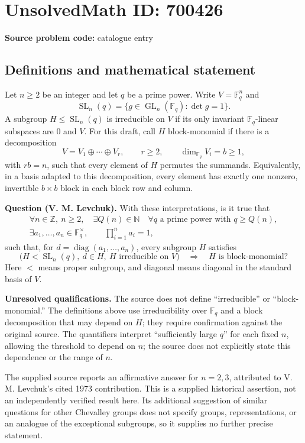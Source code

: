 \documentclass[11pt]{article}
\newcommand{\N}{\mathbb{N}}
\newcommand{\Z}{\mathbb{Z}}
\newcommand{\F}{\mathbb{F}}
\begin{document}
\section*{UnsolvedMath ID: 700426}
\textbf{Source problem code:} catalogue entry
\subsection{Definitions and mathematical statement}
Let \(n\geq 2\) be an integer and let \(q\) be a prime power. Write \(V=\F_q^n\) and
\[
\operatorname{SL}_n(q)=\{g\in\operatorname{GL}_n(\F_q):\det g=1\}.
\]
A subgroup \(H\leq\operatorname{SL}_n(q)\) is irreducible on \(V\) if its only invariant \(\F_q\)-linear subspaces are \(0\) and \(V\). For this draft, call \(H\) block-monomial if there is a decomposition
\[
V=V_1\oplus\cdots\oplus V_r,\qquad r\geq2,\qquad \dim_{\F_q}V_i=b\geq1,
\]
with \(rb=n\), such that every element of \(H\) permutes the summands. Equivalently, in a basis adapted to this decomposition, every element has exactly one nonzero, invertible \(b\times b\) block in each block row and column.

\textbf{Question (V. M. Levchuk).} With these interpretations, is it true that
\[
\begin{gathered}
\forall n\in\Z,\ n\geq2,\quad \exists Q(n)\in\N\quad
\forall q\text{ a prime power with }q\geq Q(n),\\
\exists a_1,\ldots,a_n\in\F_q^{\times},\qquad
\prod_{i=1}^{n}a_i=1,
\end{gathered}
\]
such that, for \(d=\operatorname{diag}(a_1,\ldots,a_n)\), every subgroup \(H\) satisfies
\[
\bigl(H<\operatorname{SL}_n(q),\ d\in H,\ H\text{ irreducible on }V\bigr)
\quad\Longrightarrow\quad H\text{ is block-monomial}?
\]
Here \(<\) means proper subgroup, and diagonal means diagonal in the standard basis of \(V\).

\textbf{Unresolved qualifications.} The source does not define ``irreducible'' or ``block-monomial.'' The definitions above use irreducibility over \(\F_q\) and a block decomposition that may depend on \(H\); they require confirmation against the original source. The quantifiers interpret ``sufficiently large \(q\)'' for each fixed \(n\), allowing the threshold to depend on \(n\); the source does not explicitly state this dependence or the range of \(n\).

The supplied source reports an affirmative answer for \(n=2,3\), attributed to V. M. Levchuk's cited 1973 contribution. This is a supplied historical assertion, not an independently verified result here. Its additional suggestion of similar questions for other Chevalley groups does not specify groups, representations, or an analogue of the exceptional subgroups, so it supplies no further precise statement.
\end{document}
